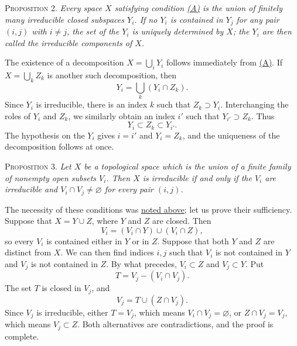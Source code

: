 \label{fac:II:1:no:30:prop:2}
\textsc{Proposition 2.} \textit{Every space $X$ satisfying condition \hyperref[fac:II:1:no:30:condition:A]{(A)} is the union of finitely many irreducible closed subspaces $Y_i$. If no $Y_i$ is contained in $Y_j$ for any pair $(i,j)$ with $i\neq j$, the set of the $Y_i$ is uniquely determined by $X$; the $Y_i$ are then called the irreducible components of $X$.}

The existence of a decomposition $X=\bigcup_iY_i$ follows immediately from \hyperref[fac:II:1:no:30:condition:A]{(A)}. If $X=\bigcup_kZ_k$ is another such decomposition, then
\[
Y_i=\bigcup_k(Y_i\cap Z_k).
\]
Since $Y_i$ is irreducible, there is an index $k$ such that $Z_k\supset Y_i$. Interchanging the roles of $Y_i$ and $Z_k$, we similarly obtain an index $i'$ such that $Y_{i'}\supset Z_k$. Thus
\[
Y_i\subset Z_k\subset Y_{i'}.
\]
The hypothesis on the $Y_i$ gives $i=i'$ and $Y_i=Z_k$, and the uniqueness of the decomposition follows at once.

\label{fac:II:1:no:30:prop:3}
\textsc{Proposition 3.} \textit{Let $X$ be a topological space which is the union of a finite family of nonempty open subsets $V_i$. Then $X$ is irreducible if and only if the $V_i$ are irreducible and $V_i\cap V_j\neq\varnothing$ for every pair $(i,j)$.}

The necessity of these conditions was \hyperref[fac:II:1:no:30:irreducible-open-properties]{noted above}; let us prove their sufficiency. Suppose that $X=Y\cup Z$, where $Y$ and $Z$ are closed. Then
\[
V_i=(V_i\cap Y)\cup(V_i\cap Z),
\]
so every $V_i$ is contained either in $Y$ or in $Z$. Suppose that both $Y$ and $Z$ are distinct from $X$. We can then find indices $i,j$ such that $V_i$ is not contained in $Y$ and $V_j$ is not contained in $Z$. By what precedes, $V_i\subset Z$ and $V_j\subset Y$. Put
\[
T=V_j-(V_i\cap V_j).
\]
The set $T$ is closed in $V_j$, and
\[
V_j=T\cup(Z\cap V_j).
\]
Since $V_j$ is irreducible, either $T=V_j$, which means $V_i\cap V_j=\varnothing$, or $Z\cap V_j=V_j$, which means $V_j\subset Z$. Both alternatives are contradictions, and the proof is complete.
